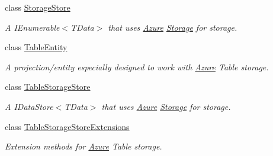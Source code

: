 \begin{DoxyCompactItemize}
class \hyperlink{classCqrs_1_1Azure_1_1BlobStorage_1_1StorageStore}{Storage\+Store}
\begin{DoxyCompactList}\small\item\em A I\+Enumerable$<$\+T\+Data$>$ that uses \hyperlink{namespaceCqrs_1_1Azure}{Azure} \hyperlink{namespaceCqrs_1_1Azure_1_1Storage}{Storage} for storage. \end{DoxyCompactList}\item 
class \hyperlink{classCqrs_1_1Azure_1_1BlobStorage_1_1TableEntity}{Table\+Entity}
\begin{DoxyCompactList}\small\item\em A projection/entity especially designed to work with \hyperlink{namespaceCqrs_1_1Azure}{Azure} Table storage. \end{DoxyCompactList}\item 
class \hyperlink{classCqrs_1_1Azure_1_1BlobStorage_1_1TableStorageStore}{Table\+Storage\+Store}
\begin{DoxyCompactList}\small\item\em A I\+Data\+Store$<$\+T\+Data$>$ that uses \hyperlink{namespaceCqrs_1_1Azure}{Azure} \hyperlink{namespaceCqrs_1_1Azure_1_1Storage}{Storage} for storage. \end{DoxyCompactList}\item 
class \hyperlink{classCqrs_1_1Azure_1_1BlobStorage_1_1TableStorageStoreExtensions}{Table\+Storage\+Store\+Extensions}
\begin{DoxyCompactList}\small\item\em Extension methods for \hyperlink{namespaceCqrs_1_1Azure}{Azure} Table storage. \end{DoxyCompactList}\end{DoxyCompactItemize}
